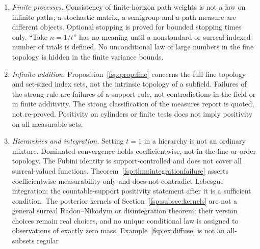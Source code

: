 \documentclass[11pt,a4paper]{article}
\numberwithin{equation}{section}
\theoremstyle{definition}
\theoremstyle{remark}
\begin{document}
\begin{enumerate}[label=(N\arabic*),leftmargin=3.2em]
$+\infty$ of a relative entropy is formal. Entropy can leave a pure Laurent
field, and no single Hahn field is assumed closed under the information
operations. No entropy rate of a process is supplied, and standard part does
not commute with relative entropy. The logistic optimum comes from an explicit
identity, not an extreme-value theorem. The Gibbs principle constructs no
thermodynamic limit, infinite-volume Gibbs measure or partition function on an
infinite state space. The standard part of an expected utility needs limited
payoffs, and surreal arithmetic does not decide which utilities and trades are
admissible. The smoothing constants and scale are modeling choices, and the
case $N=0$ is an ordinary prior. Proposition~\ref{fsp:prop:separation} gives
no existence theorem for constrained or regularized regression.
\item \emph{Finite processes.} Consistency of finite-horizon path weights is not
a law on infinite paths; a stochastic matrix, a semigroup and a path measure are
different objects. Optional stopping is proved for bounded stopping times only.
``Take $n=1/t$'' has no meaning until a nonstandard or surreal-indexed number of
trials is defined. No unconditional law of large numbers in the fine topology is
hidden in the finite variance bounds.
\item \emph{Infinite addition.} Proposition~\ref{fsp:prop:fine} concerns the full
fine topology and set-sized index sets, not the intrinsic topology of a subfield.
Failures of the strong rule are failures of a support rule, not contradictions
in the field or in finite additivity. The strong classification of the measures
report is quoted, not re-proved. Positivity on cylinders or finite tests does
not imply positivity on all measurable sets.
\item \emph{Hierarchies and integration.} Setting $t=1$ in a hierarchy is not an
ordinary mixture. Dominated convergence holds coefficientwise, not in the fine
or order topology. The Fubini identity is support-controlled and does not cover
all surreal-valued functions. Theorem~\ref{fsp:thm:integrationfailure} asserts
coefficientwise measurability only and does not contradict Lebesgue integration;
the countable-support positivity statement after it is a sufficient condition.
The posterior kernels of Section~\ref{fsp:subsec:kernels} are not a general
surreal Radon--Nikodym or disintegration theorem; their version choices remain
real choices, and no unique conditional law is assigned to observations of
exactly zero mass. Example~\ref{fsp:ex:diffuse} is not an all-subsets regular

\end{enumerate}
\end{document}
